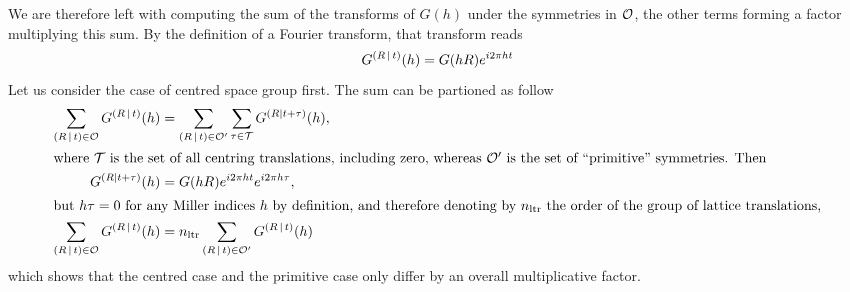 \documentclass[pdf]{iucr}
\begin{document}
We are therefore left with computing the sum of the transforms of $G(h)$ under the symmetries in $\cal{O}$, the other terms forming a factor multiplying this sum. By the definition of a Fourier transform, that transform reads
\begin{equation}
G^{\left( R\,\vert\, t \right)}(h) = G(hR)e^{i 2\pi ht}
\label{eqn:transformofG}
\end{equation}
Let us consider the case of centred space group first. The sum can be partioned as follow
\begin{align}
 \sum_{\left( R\,\vert\, t \right) \in \cal{O}} G^{\left( R\,\vert\, t \right)}(h) &=  \sum_{\left( R\,\vert\, t \right) \in \cal{O'}} \sum_{\tau \in \cal{T}} G^{(R \mid t+\tau)}(h), \nonumber\\
\shortintertext{where $\cal{T}$ is the set of all centring translations, including zero, whereas $\cal{O'}$ is the set of ``primitive'' symmetries. Then}
G^{(R \mid t + \tau)}(h) &= G(hR) e^{i2\pi ht} e^{i2\pi h\tau}, \nonumber \\
\shortintertext{but $h\tau=0$ for any Miller indices $h$ by definition, and therefore denoting by $n_{\text{ltr}}$ the order of the group of lattice translations,}
\sum_{\left( R\,\vert\, t \right) \in \cal{O}} G^{\left( R\,\vert\, t \right)}(h) &= n_{\text{ltr}} \sum_{\left( R\,\vert\, t \right) \in \cal{O'}} G^{\left( R\,\vert\, t \right)}(h)
\end{align}
which shows that the centred case and the primitive case only differ by an overall multiplicative factor.
\end{document}
